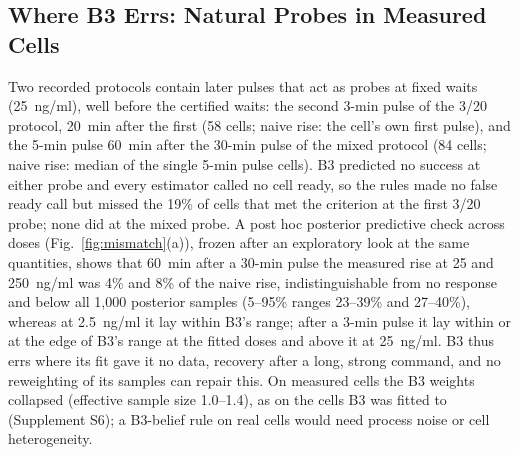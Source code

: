 \documentclass[conference]{IEEEtran}
\begin{document}
\subsection{Where B3 Errs: Natural Probes in Measured Cells}
\label{sec:natural}
Two recorded protocols contain later pulses that act as probes at fixed waits (25~ng/ml), well before the certified waits: the second 3-min pulse of the 3/20 protocol, 20~min after the first (58 cells; naive rise: the cell's own first pulse), and the 5-min pulse 60~min after the 30-min pulse of the mixed protocol (84 cells; naive rise: median of the single 5-min pulse cells). B3 predicted no success at either probe and every estimator called no cell ready, so the rules made no false ready call but missed the 19\% of cells that met the criterion at the first 3/20 probe; none did at the mixed probe. A post hoc posterior predictive check across doses (Fig.~\ref{fig:mismatch}(a)), frozen after an exploratory look at the same quantities, shows that 60~min after a 30-min pulse the measured rise at 25 and 250~ng/ml was 4\% and 8\% of the naive rise, indistinguishable from no response and below all 1,000 posterior samples (5--95\% ranges 23--39\% and 27--40\%), whereas at 2.5~ng/ml it lay within B3's range; after a 3-min pulse it lay within or at the edge of B3's range at the fitted doses and above it at 25~ng/ml. B3 thus errs where its fit gave it no data, recovery after a long, strong command, and no reweighting of its samples can repair this. On measured cells the B3 weights collapsed (effective sample size 1.0--1.4), as on the cells B3 was fitted to (Supplement S6); a B3-belief rule on real cells would need process noise or cell heterogeneity.
\end{document}
